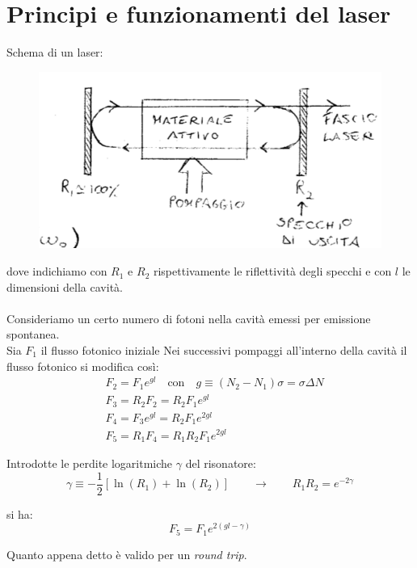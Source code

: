 \section{Principi e funzionamenti del laser}
Schema di un laser:
\begin{figure}[H]
    \centering
    \includegraphics{schema_laser}
\end{figure}
dove indichiamo con $R_1$ e $R_2$ rispettivamente le riflettività degli specchi e con $l$ le dimensioni della cavità.\\
\\
Consideriamo un certo numero di fotoni nella cavità emessi per emissione spontanea.\\
Sia $F_1$ il flusso fotonico iniziale 
Nei successivi pompaggi all'interno della cavità il flusso fotonico si modifica così:
\begin{align*}
    & F_2 = F_1 e^{gl} \quad \text{con} \quad g \equiv (N_2 - N_1) \sigma = \sigma \Delta N\\
    & F_3 = R_2 F_2 = R_2 F_1 e^{gl}\\
    & F_4 = F_3 e^{gl} = R_2 F_1 e^{2gl}\\
    & F_5 = R_1 F_4 = R_1 R_2 F_1 e^{2gl}
\end{align*}

Introdotte le perdite logaritmiche $\gamma$ del risonatore:
\begin{equation*}
    \gamma \equiv -\frac{1}{2} \left[\ln (R_1) + \ln (R_2) \right] \qquad \rightarrow \qquad R_1 R_2 = e^{-2 \gamma}
\end{equation*}

si ha:
\begin{equation*}
    F_5 = F_1 e^{2(gl - \gamma)}
\end{equation*}

Quanto appena detto è valido per un \textit{round trip}.

